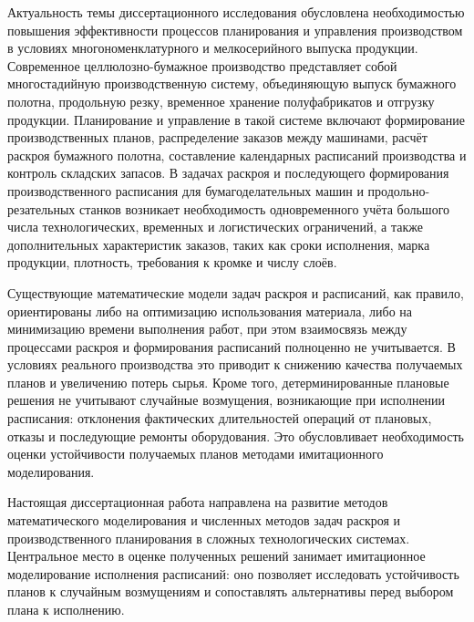 
{\actuality} Актуальность темы диссертационного исследования обусловлена необходимостью
повышения эффективности процессов планирования и управления производством
в условиях многономенклатурного и мелкосерийного выпуска продукции.
Современное целлюлозно-бумажное производство представляет собой многостадийную
производственную систему, объединяющую выпуск бумажного полотна,
продольную резку, временное хранение полуфабрикатов и отгрузку продукции.
Планирование и управление в такой системе включают формирование производственных
планов, распределение заказов между машинами, расчёт раскроя бумажного полотна,
составление календарных расписаний производства и контроль складских запасов.
В задачах раскроя и последующего формирования производственного расписания
для бумагоделательных машин и продольно-резательных станков
возникает необходимость одновременного учёта большого числа
технологических, временных и логистических ограничений, а также
дополнительных характеристик заказов, таких как сроки исполнения,
марка продукции, плотность, требования к кромке и числу слоёв.

Существующие математические модели задач раскроя и расписаний, как правило,
ориентированы либо на оптимизацию использования материала, либо на
минимизацию времени выполнения работ, при этом взаимосвязь между
процессами раскроя и формирования расписаний полноценно не учитывается.
В условиях реального производства это приводит к снижению качества
получаемых планов и увеличению потерь сырья.
Кроме того, детерминированные плановые решения не учитывают
случайные возмущения, возникающие при исполнении расписания:
отклонения фактических длительностей операций от плановых,
отказы и последующие ремонты оборудования.
Это обусловливает необходимость оценки устойчивости получаемых
планов методами имитационного моделирования.


\ifsynopsis
\else
Настоящая диссертационная работа направлена на развитие методов
математического моделирования и численных методов
задач раскроя и производственного планирования в сложных
технологических системах. Центральное место в оценке полученных решений
занимает имитационное моделирование исполнения расписаний: оно позволяет
исследовать устойчивость планов к случайным возмущениям и сопоставлять
альтернативы перед выбором плана к исполнению.
\fi

